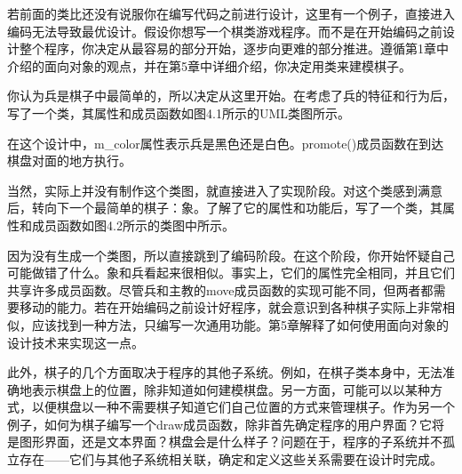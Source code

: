 若前面的类比还没有说服你在编写代码之前进行设计，这里有一个例子，直接进入编码无法导致最优设计。假设你想写一个棋类游戏程序。而不是在开始编码之前设计整个程序，你决定从最容易的部分开始，逐步向更难的部分推进。遵循第1章中介绍的面向对象的观点，并在第5章中详细介绍，你决定用类来建模棋子。

你认为兵是棋子中最简单的，所以决定从这里开始。在考虑了兵的特征和行为后，写了一个类，其属性和成员函数如图4.1所示的UML类图所示。


在这个设计中，m\_color属性表示兵是黑色还是白色。promote()成员函数在到达棋盘对面的地方执行。

当然，实际上并没有制作这个类图，就直接进入了实现阶段。对这个类感到满意后，转向下一个最简单的棋子：象。了解了它的属性和功能后，写了一个类，其属性和成员函数如图4.2所示的类图中所示。


因为没有生成一个类图，所以直接跳到了编码阶段。在这个阶段，你开始怀疑自己可能做错了什么。象和兵看起来很相似。事实上，它们的属性完全相同，并且它们共享许多成员函数。尽管兵和主教的move成员函数的实现可能不同，但两者都需要移动的能力。若在开始编码之前设计好程序，就会意识到各种棋子实际上非常相似，应该找到一种方法，只编写一次通用功能。第5章解释了如何使用面向对象的设计技术来实现这一点。

此外，棋子的几个方面取决于程序的其他子系统。例如，在棋子类本身中，无法准确地表示棋盘上的位置，除非知道如何建模棋盘。另一方面，可能可以以某种方式，以便棋盘以一种不需要棋子知道它们自己位置的方式来管理棋子。作为另一个例子，如何为棋子编写一个draw成员函数，除非首先确定程序的用户界面？它将是图形界面，还是文本界面？棋盘会是什么样子？问题在于，程序的子系统并不孤立存在——它们与其他子系统相关联，确定和定义这些关系需要在设计时完成。




